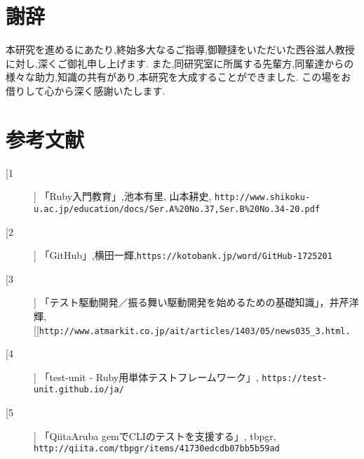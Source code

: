 \section{謝辞}
本研究を進めるにあたり,終始多大なるご指導,御鞭撻をいただいた西谷滋人教授に対し,深くご御礼申し上げます.
また,同研究室に所属する先輩方,同輩達からの様々な助力,知識の共有があり,本研究を大成することができました.
この場をお借りして心から深く感謝いたします.

\section{参考文献}\begin{description}
\item[[1]] 「Ruby入門教育」,池本有里, 山本耕史, \verb|http://www.shikoku-u.ac.jp/education/docs/Ser.A%20No.37,Ser.B%20No.34-20.pdf|

\item[[2]] 「GitHub」,横田一輝,\verb|https://kotobank.jp/word/GitHub-1725201|

\item[[3]] 「テスト駆動開発／振る舞い駆動開発を始めるための基礎知識」，井芹洋輝, [[\verb|http://www.atmarkit.co.jp/ait/articles/1403/05/news035_3.html.|

\item[[4]] 「test-unit - Ruby用単体テストフレームワーク」, \verb|https://test-unit.github.io/ja/|

\item[[5]] 「QiitaAruba gemでCLIのテストを支援する」, tbpgr, \verb|http://qiita.com/tbpgr/items/41730edcdb07bb5b59ad|

\end{description}

